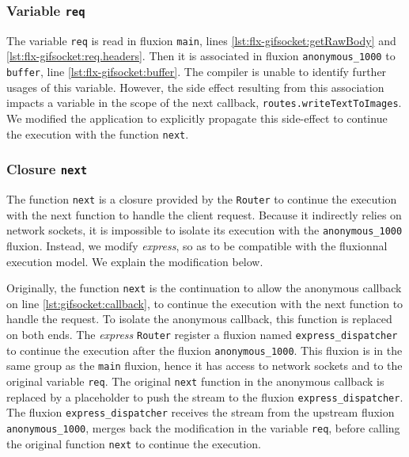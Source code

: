 \subsubsection{Variable \texttt{req}}

The variable \texttt{req} is read in fluxion \texttt{main}, lines \ref{lst:flx-gifsocket:getRawBody} and \ref{lst:flx-gifsocket:req.headers}.
Then it is associated in fluxion \texttt{anonymous\_1000} to \texttt{buffer}, line \ref{lst:flx-gifsocket:buffer}.
The compiler is unable to identify further usages of this variable.
However, the side effect resulting from this association impacts a variable in the scope of the next callback, \texttt{routes.writeTextToImages}.
We modified the application to explicitly propagate this side-effect to continue the execution with the function \texttt{next}.


\subsubsection{Closure \texttt{next}}

The function \texttt{next} is a closure provided by the \texttt{Router} to continue the execution with the next function to handle the client request.
Because it indirectly relies on network sockets, it is impossible to isolate its execution with the \texttt{anonymous\-\_1000} fluxion.
Instead, we modify \textit{express}, so as to be compatible with the fluxionnal execution model.
We explain the modification below.%

Originally, the function \texttt{next} is the continuation to allow the anonymous callback on line \ref{lst:gifsocket:callback}, to continue the execution with the next function to handle the request.
To isolate the anonymous callback, this function is replaced on both ends.
The \textit{express} \texttt{Router} register a fluxion named \texttt{express\-\_dispatcher} to continue the execution after the fluxion \texttt{anonymous\-\_1000}.
This fluxion is in the same group as the \texttt{main} fluxion, hence it has access to network sockets and to the original variable \texttt{req}.
The original \texttt{next} function in the anonymous callback is replaced by a placeholder to push the stream to the fluxion \texttt{express\-\_dispatcher}.
The fluxion \texttt{express\-\_dispatcher} receives the stream from the upstream fluxion \texttt{anonymous\-\_1000}, merges back the modification in the variable \texttt{req}, before calling the original function \texttt{next} to continue the execution.


